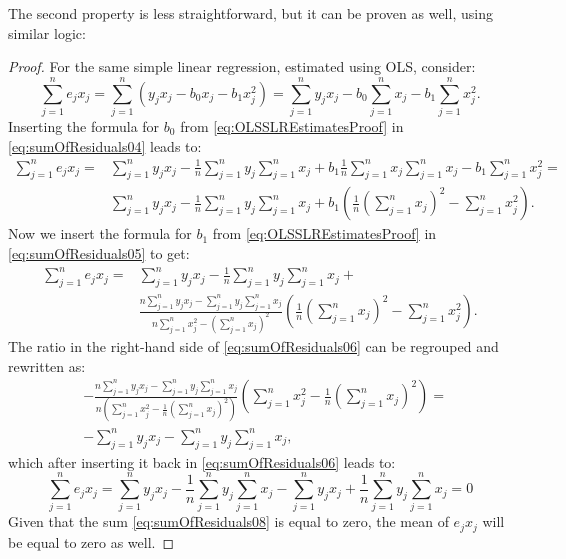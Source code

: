\documentclass[
]{book}
\theoremstyle{definition}
\theoremstyle{definition}
\theoremstyle{definition}
\theoremstyle{definition}
\theoremstyle{remark}
\begin{document}
The second property is less straightforward, but it can be proven as well, using similar logic:

\begin{proof}
For the same simple linear regression, estimated using OLS, consider:
\begin{equation}
    \sum_{j=1}^n e_j x_j = \sum_{j=1}^n (y_j x_j -b_0 x_j -b_1 x_j^2) = \sum_{j=1}^n y_j x_j -b_0 \sum_{j=1}^n x_j -b_1 \sum_{j=1}^n x_j^2 .
    \label{eq:sumOfResiduals04}
\end{equation}
Inserting the formula for \(b_0\) from \eqref{eq:OLSSLREstimatesProof} in \eqref{eq:sumOfResiduals04} leads to:
\begin{equation}
    \begin{aligned}
        \sum_{j=1}^n e_j x_j = & \sum_{j=1}^n y_j x_j - \frac{1}{n}\sum_{j=1}^n y_j \sum_{j=1}^n x_j + b_1 \frac{1}{n}\sum_{j=1}^n x_j \sum_{j=1}^n x_j - b_1 \sum_{j=1}^n x_j^2 = \\
                               & \sum_{j=1}^n y_j x_j - \frac{1}{n}\sum_{j=1}^n y_j \sum_{j=1}^n x_j + b_1 \left( \frac{1}{n} \left(\sum_{j=1}^n x_j \right)^2 - \sum_{j=1}^n x_j^2 \right) .
    \end{aligned}
    \label{eq:sumOfResiduals05}
\end{equation}
Now we insert the formula for \(b_1\) from \eqref{eq:OLSSLREstimatesProof} in \eqref{eq:sumOfResiduals05} to get:
\begin{equation}
    \begin{aligned}
        \sum_{j=1}^n e_j x_j = & \sum_{j=1}^n y_j x_j - \frac{1}{n}\sum_{j=1}^n y_j \sum_{j=1}^n x_j + \\
         & \frac{n \sum_{j=1}^n y_j x_j - \sum_{j=1}^n y_j \sum_{j=1}^n x_j}{n \sum_{j=1}^n x_j^2 - \left(\sum_{j=1}^n x_j \right)^2} \left( \frac{1}{n} \left(\sum_{j=1}^n x_j \right)^2 - \sum_{j=1}^n x_j^2 \right) .
    \end{aligned}
    \label{eq:sumOfResiduals06}
\end{equation}
The ratio in the right-hand side of \eqref{eq:sumOfResiduals06} can be regrouped and rewritten as:
\begin{equation}
    \begin{aligned}
        & -\frac{n \sum_{j=1}^n y_j x_j - \sum_{j=1}^n y_j \sum_{j=1}^n x_j}{n \left( \sum_{j=1}^n x_j^2 - \frac{1}{n}\left(\sum_{j=1}^n x_j \right)^2 \right)} \left( \sum_{j=1}^n x_j^2 - \frac{1}{n} \left(\sum_{j=1}^n x_j\right)^2 \right) = \\
        & - \sum_{j=1}^n y_j x_j - \sum_{j=1}^n y_j \sum_{j=1}^n x_j,
    \end{aligned}
    \label{eq:sumOfResiduals07}
\end{equation}
which after inserting it back in \eqref{eq:sumOfResiduals06} leads to:
\begin{equation}
    \sum_{j=1}^n e_j x_j = \sum_{j=1}^n y_j x_j - \frac{1}{n}\sum_{j=1}^n y_j \sum_{j=1}^n x_j - \sum_{j=1}^n y_j x_j + \frac{1}{n} \sum_{j=1}^n y_j \sum_{j=1}^n x_j = 0
    \label{eq:sumOfResiduals08}
\end{equation}
Given that the sum \eqref{eq:sumOfResiduals08} is equal to zero, the mean of \(e_j x_j\) will be equal to zero as well.
\end{proof}
\end{document}
